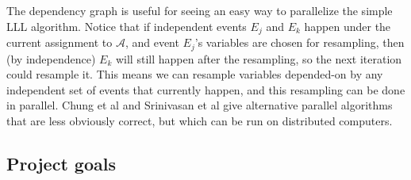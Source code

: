 \documentclass{article}
\begin{document}
The dependency graph is useful for seeing an easy way to parallelize the simple LLL algorithm.  Notice that if independent events $E_j$ and $E_k$ happen under the current assignment to $\mathcal{A}$, and event $E_j$'s variables are chosen for resampling, then (by independence) $E_k$ will still happen after the resampling, so the next iteration could resample it.  This means we can resample variables depended-on by any independent set of events that currently happen, and this resampling can be done in parallel.  Chung et al \cite{chung2014distributed} and Srinivasan et al \cite{haeupler2011new} give alternative parallel algorithms that are less obviously correct, but which can be run on distributed computers.

\subsection{Project goals}




\end{document}
